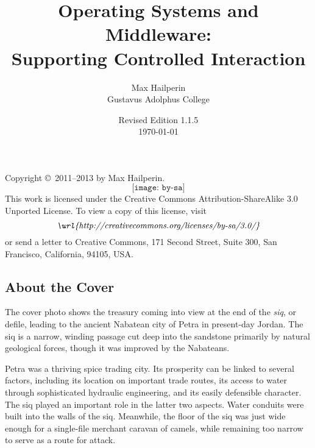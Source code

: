 \documentclass[11pt]{book}
\title{Operating Systems and Middleware:\\Supporting Controlled Interaction}
\author{Max Hailperin\\Gustavus Adolphus College}
\date{Revised Edition 1.1.5\\\today}
\begin{document}

\frontmatter
\iffancytitlepage
{}
\makeatletter
{}%
\makeatother
\else
\maketitle
\fi

\clearpage\thispagestyle{empty}
\noindent Copyright \copyright\ 2011--2013 by Max Hailperin.
\[\texttt{[image: by-sa]}\]
This work is licensed under the Creative Commons Attribution-ShareAlike 3.0 Unported License. To view a copy of this
license, visit
\[ \textit{\url{http://creativecommons.org/licenses/by-sa/3.0/}} \]
or send a letter to Creative Commons, 171 Second Street,
Suite 300, San Francisco, California, 94105, USA.
\iffancytitlepage
\subsection*{About the Cover}
The cover photo shows the treasury coming into view at the end of the \textit{siq}, or defile, leading to the ancient Nabatean city of Petra in present-day Jordan. The siq is a narrow, winding passage cut deep into the sandstone primarily by natural geological forces, though it was improved by the Nabateans.

Petra was a thriving spice trading city. Its prosperity can be linked to several factors, including its location on important trade routes, its access to water through sophisticated hydraulic engineering, and its easily defensible character. The siq played an important role in the latter two aspects. Water conduits were built into the walls of the siq. Meanwhile, the floor of the siq was just wide enough for a single-file merchant caravan of camels, while remaining too narrow to serve as a route for attack.
\end{document}

